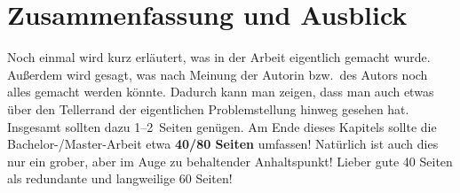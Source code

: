\chapter{Zusammenfassung und Ausblick}
\label{chap:zusammenfassung}

Noch einmal wird kurz erläutert, was in der Arbeit eigentlich gemacht 
wurde. Außerdem wird gesagt, was nach Meinung der Autorin bzw.\ des
Autors noch alles gemacht werden könnte. Dadurch kann man zeigen, dass
man auch etwas über den Tellerrand der eigentlichen Problemstellung
hinweg gesehen hat. Insgesamt sollten dazu 1--2~Seiten genügen. 
Am Ende dieses Kapitels sollte die Bachelor-/Master-Arbeit etwa 
{\bf 40/80 Seiten} umfassen! \setcounter{page}{40}
Natürlich ist auch dies nur ein grober, aber im Auge zu behaltender
Anhaltspunkt! Lieber gute 40 Seiten als redundante und langweilige 60 Seiten!